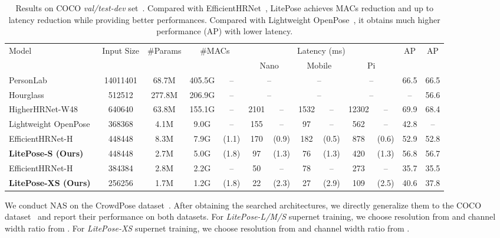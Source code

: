 \documentclass[10pt,twocolumn,letterpaper]{article}
\begin{document}
\begin{table*}[t]
\setlength{\tabcolsep}{3pt}
  \centering
  \small
  \begin{tabular}{lcccccccccccc}
    \toprule
    \multirow{2}{*}[\multirowcenter]{Model} & \multirow{2}{*}[\multirowcenter]{Input Size} & \multirow{2}{*}[\multirowcenter]{\#Params} & \multicolumn{2}{c}{\multirow{2}{*}[\multirowcenter]{\#MACs}} & \multicolumn{6}{c}{Latency (ms)} & \multirow{2}{*}[\multirowcenter]{AP} & \multirow{2}{*}[\multirowcenter]{AP} \\
    \cmidrule{6-11} 
    & & & & & \multicolumn{2}{c}{Nano} & \multicolumn{2}{c}{Mobile} & \multicolumn{2}{c}{Pi}\\
    \midrule
    PersonLab~\cite{papandreou2018personlab} & 14011401 & 68.7M & 405.5G & -- & \multicolumn{2}{c}{--} & \multicolumn{2}{c}{--} & \multicolumn{2}{c}{--} & 66.5 & 66.5\\
    Hourglass~\cite{newell2016stacked} & 512512 & 277.8M & 206.9G& -- & \multicolumn{2}{c}{--} & \multicolumn{2}{c}{--} & \multicolumn{2}{c}{--} & --&56.6\\
    HigherHRNet-W48~\cite{cheng2020higherhrnet} & 640640 & 63.8M & 155.1G & -- & 2101 & -- & 1532 & -- & 12302 & -- & 69.9 & 68.4\\
    \midrule
    Lightweight OpenPose~\cite{osokin2018real} & 368368 & 4.1M & 9.0G & -- & 155 & -- & 97 & -- & 562 & -- & 42.8 & --\\
    EfficientHRNet-H~\cite{neff2020efficienthrnet} & 448448 & 8.3M & 7.9G & (1.1) & 170 & (0.9) &182 & (0.5) & 878 & (0.6) & 52.9 & 52.8\\
    \textbf{LitePose-S (Ours)} & 448448 & 2.7M & 5.0G & (1.8) & 97 & (1.3) & 76 & (1.3) & 420 & (1.3) & 56.8 & 56.7\\
    \midrule
    EfficientHRNet-H & 384384 & 2.8M & 2.2G & -- & 50 & -- & 78 & -- & 273 & -- & 35.7 & 35.5\\
    \textbf{LitePose-XS (Ours)} & 256256 & 1.7M & 1.2G & (1.8) & 22 & (2.3) & 27 & (2.9) &109 & (2.5) & 40.6 & 37.8\\
    \bottomrule
  \end{tabular}
  \caption{Results on COCO \textit{val/test-dev} set~\cite{lin2014microsoft}. Compared with EfficientHRNet~\cite{neff2020efficienthrnet}, LitePose achieves  MACs reduction and up to  latency reduction while providing better performances. Compared with Lightweight OpenPose~\cite{osokin2018real}, it obtains much higher performance (AP) with lower latency.}
  \label{tab:COCO}
\end{table*} 
We conduct NAS on the CrowdPose dataset~\cite{li2019crowdpose}. After obtaining the searched architectures, we directly generalize them to the COCO dataset~\cite{lin2014microsoft} and report their performance on both datasets. For \textit{LitePose-L/M/S} supernet training, we choose resolution from  and channel width ratio from . For \textit{LitePose-XS} supernet training, we choose resolution from  and channel width ratio from .
\end{document}
